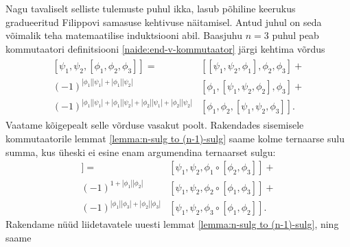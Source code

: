 Nagu tavaliselt selliste tulemuste puhul ikka, lasub põhiline keerukus
gradueeritud Filippovi samasuse kehtivuse näitamisel.
Antud juhul on seda võimalik teha matemaatilise induktsiooni abil.
Baasjuhu $n = 3$ puhul peab kommutaatori definitsiooni
\eqref{naide:end-v-kommutaator} järgi kehtima võrdus
\begin{align}\begin{split}\label{eq:tern endomorphism filippov}
    [\psi_1, \psi_2, [\phi_1, \phi_2, \phi_3]] =\
    &[[\psi_1, \psi_2, \phi_1], \phi_2, \phi_3] + \\
    (-1)^{|\phi_1||\psi_1| + |\phi_1||\psi_2|}
        &[\phi_1, [\psi_1, \psi_2, \phi_2], \phi_3] + \\
    (-1)^{
        |\phi_1||\psi_1| + |\phi_1||\psi_2| +
        |\phi_2||\psi_1| + |\phi_2||\psi_2|
    } &[\phi_1, \phi_2, [\psi_1, \psi_2, \phi_3]].
\end{split}\end{align}
Vaatame kõigepealt selle võrduse vasakut poolt. Rakendades sisemisele
kommutaatorile lemmat \ref{lemma:n-sulg to (n-1)-sulg} saame kolme
ternaarse sulu summa, kus üheski ei esine enam argumendina ternaarset sulgu:
\begin{align*}
    [\psi_1, \psi_2, [\phi_1, \phi_2, \phi_3]] =\
    &[\psi_1, \psi_2, \phi_1 \circ [\phi_2, \phi_3]] + \\
    (-1)^{1 + |\phi_1||\phi_2|}
        &[\psi_1, \psi_2, \phi_2 \circ [\phi_1, \phi_3]] + \\
    (-1)^{|\phi_1||\phi_3| + |\phi_2||\phi_3|}
        &[\psi_1, \psi_2, \phi_3 \circ [\phi_1, \phi_2]].
\end{align*}
Rakendame nüüd liidetavatele uuesti lemmat \ref{lemma:n-sulg to (n-1)-sulg},
ning saame
